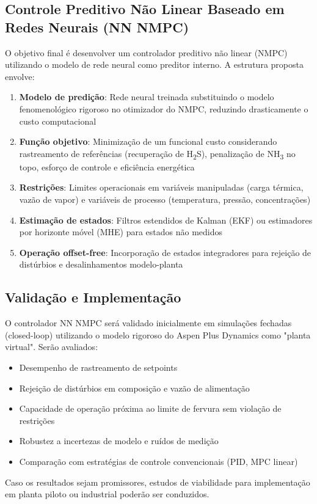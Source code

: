 \subsection{Controle Preditivo Não Linear Baseado em Redes Neurais (NN NMPC)}

O objetivo final é desenvolver um controlador preditivo não linear (NMPC) utilizando o modelo de rede neural como preditor interno. A estrutura proposta envolve:

\begin{enumerate}
  \item \textbf{Modelo de predição}: Rede neural treinada substituindo o modelo fenomenológico rigoroso no otimizador do NMPC, reduzindo drasticamente o custo computacional
  \item \textbf{Função objetivo}: Minimização de um funcional custo considerando rastreamento de referências (recuperação de H\textsubscript{2}S), penalização de NH\textsubscript{3} no topo, esforço de controle e eficiência energética
  \item \textbf{Restrições}: Limites operacionais em variáveis manipuladas (carga térmica, vazão de vapor) e variáveis de processo (temperatura, pressão, concentrações)
  \item \textbf{Estimação de estados}: Filtros estendidos de Kalman (EKF) ou estimadores por horizonte móvel (MHE) para estados não medidos
  \item \textbf{Operação offset-free}: Incorporação de estados integradores para rejeição de distúrbios e desalinhamentos modelo-planta
\end{enumerate}

\subsection{Validação e Implementação}

O controlador NN NMPC será validado inicialmente em simulações fechadas (closed-loop) utilizando o modelo rigoroso do Aspen Plus Dynamics como "planta virtual". Serão avaliados:

\begin{itemize}[leftmargin=*]
  \item Desempenho de rastreamento de setpoints
  \item Rejeição de distúrbios em composição e vazão de alimentação
  \item Capacidade de operação próxima ao limite de fervura sem violação de restrições
  \item Robustez a incertezas de modelo e ruídos de medição
  \item Comparação com estratégias de controle convencionais (PID, MPC linear)
\end{itemize}

Caso os resultados sejam promissores, estudos de viabilidade para implementação em planta piloto ou industrial poderão ser conduzidos.
